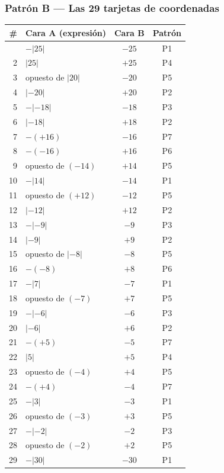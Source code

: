 \documentclass[12pt, letterpaper]{article}
\newcommand{\abs}[1]{\lvert #1\rvert}
\begin{document}
\subsubsection{Patrón B — Las 29 tarjetas de coordenadas}

\begin{longtable}{@{}r l c c@{}}
\toprule
\textbf{\#} & \textbf{Cara A (expresión)} & \textbf{Cara B} & \textbf{Patrón}\\
\midrule
\endhead
\bottomrule
\endfoot
1 & $-\abs{25}$ & $-25$ & P1\\
2 & $\abs{25}$ & $+25$ & P4\\
3 & opuesto de $\abs{20}$ & $-20$ & P5\\
4 & $\abs{-20}$ & $+20$ & P2\\
5 & $-\abs{-18}$ & $-18$ & P3\\
6 & $\abs{-18}$ & $+18$ & P2\\
7 & $-(+16)$ & $-16$ & P7\\
8 & $-(-16)$ & $+16$ & P6\\
9 & opuesto de $(-14)$ & $+14$ & P5\\
10 & $-\abs{14}$ & $-14$ & P1\\
11 & opuesto de $(+12)$ & $-12$ & P5\\
12 & $\abs{-12}$ & $+12$ & P2\\
13 & $-\abs{-9}$ & $-9$ & P3\\
14 & $\abs{-9}$ & $+9$ & P2\\
15 & opuesto de $\abs{-8}$ & $-8$ & P5\\
16 & $-(-8)$ & $+8$ & P6\\
17 & $-\abs{7}$ & $-7$ & P1\\
18 & opuesto de $(-7)$ & $+7$ & P5\\
19 & $-\abs{-6}$ & $-6$ & P3\\
20 & $\abs{-6}$ & $+6$ & P2\\
21 & $-(+5)$ & $-5$ & P7\\
22 & $\abs{5}$ & $+5$ & P4\\
23 & opuesto de $(-4)$ & $+4$ & P5\\
24 & $-(+4)$ & $-4$ & P7\\
25 & $-\abs{3}$ & $-3$ & P1\\
26 & opuesto de $(-3)$ & $+3$ & P5\\
27 & $-\abs{-2}$ & $-2$ & P3\\
28 & opuesto de $(-2)$ & $+2$ & P5\\
29 & $-\abs{30}$ & $-30$ & P1\\
\end{longtable}
\end{document}
